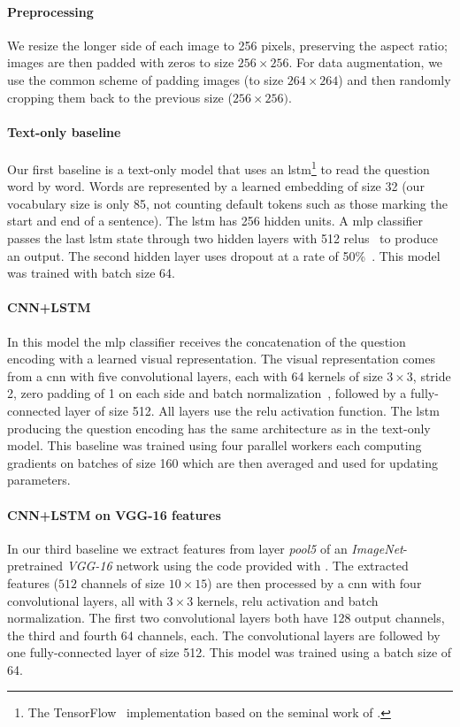 \documentclass{article} %
\begin{document}
\paragraph{Preprocessing} We resize the longer side of each image to 256 pixels, preserving the aspect ratio; images are then padded with zeros to size $256\times256$. For data augmentation, we use the common scheme of padding images (to size $264\times264$) and then randomly cropping them back to the previous size ($256\times256)$.

\paragraph{Text-only baseline}
Our first baseline is a text-only model that uses an \gls{lstm}\footnote{The TensorFlow~\citep{abadi2016tensorflow} implementation based on the seminal work of \citet{hochreiter1997long}.} to read the question word by word. Words are represented by a learned embedding of size 32 (our vocabulary size is only 85, not counting default tokens such as those marking the start and end of a sentence). The \gls{lstm} has 256 hidden units. 
A \gls{mlp} classifier passes the last \gls{lstm} state through two hidden layers with 512 \glspl{relu}~\citep{nair2010rectified} to produce an output. The second hidden layer uses dropout at a rate of 50\%~\citep{srivastava2014dropout}. This model was trained with batch size 64.

\paragraph{CNN+LSTM}
In this model the \gls{mlp} classifier receives the concatenation of the question encoding with a learned visual representation.
The visual representation comes from a \gls{cnn} with five convolutional layers, each with 64 kernels of size $3\times3$, stride 2, zero padding of 1 on each side and batch normalization~\citep{ioffe2015batch}, followed by a fully-connected layer of size 512. All layers use the \gls{relu} activation function.
The \gls{lstm} producing the question encoding has the same architecture as in the text-only model. This baseline was trained using four parallel workers each computing gradients on batches of size 160 which are then averaged and used for updating parameters.

\paragraph{CNN+LSTM on VGG-16 features}
In our third baseline we extract features from layer \emph{pool5} of an \emph{ImageNet}-pretrained \emph{VGG-16} network \citep{simonyan2014very} using the code provided with \citet{hu2017learning}. 
The extracted features ($512$ channels of size $10\times15$) are then processed by a \gls{cnn} with four convolutional layers, all with $3\times3$ kernels, \gls{relu} activation and batch normalization. The first two convolutional layers both have 128 output channels, the third and fourth 64 channels, each.
The convolutional layers are followed by one fully-connected layer of size 512. This model was trained using a batch size of 64.
\end{document}

